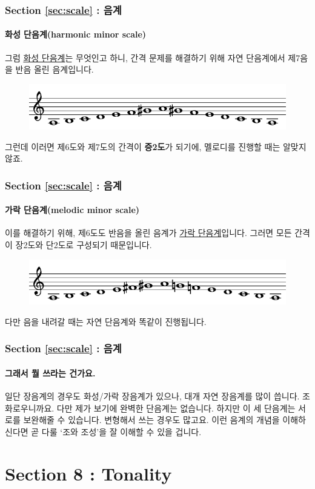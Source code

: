 \documentclass{beamer}
\begin{document}
	\begin{frame}
		\frametitle{Section \ref{sec:scale} : 음계}
		\framesubtitle{화성 단음계(harmonic minor scale)}
		그럼 {\color{cyan}\href{run:res/mp3/7/scale/harmonic_minor.mp3}{화성 단음계}}는 무엇인고 하니, 간격 문제를 해결하기 위해 자연 단음계에서 제7음을 반음 올린 음계입니다.
		\begin{figure}[!h]
			\centering
			{\includegraphics[width=\textwidth]{res/pdf/7/scale/harmonic_minor.pdf}}
		\end{figure}
		그런데 이러면 제6도와 제7도의 간격이 {\bf 증2도}가 되기에, 멜로디를 진행할 때는 알맞지 않죠. 
	\end{frame}
	
	\begin{frame}
		\frametitle{Section \ref{sec:scale} : 음계}
		\framesubtitle{가락 단음계(melodic minor scale)}
		이를 해결하기 위해, 제6도도 반음을 올린 음계가 {\color{cyan}\href{run:res/mp3/7/scale/melodic_minor.mp3}{가락 단음계}}입니다. 그러면 모든 간격이 장2도와 단2도로 구성되기 때문입니다.
		\begin{figure}[!h]
			\centering
			{\includegraphics[width=\textwidth]{res/pdf/7/scale/melodic_minor.pdf}}
		\end{figure}
		다만 음을 내려갈 때는 자연 단음계와 똑같이 진행됩니다.
	\end{frame}
	
	\begin{frame}
		\frametitle{Section \ref{sec:scale} : 음계}
		\framesubtitle{그래서 뭘 쓰라는 건가요.}
		일단 장음계의 경우도 화성/가락 장음계가 있으나, 대개 자연 장음계를 많이 씁니다. 조화로우니까요. 다만 제가 보기에 완벽한 단음계는 없습니다. 하지만 이 세 단음계는 서로를 보완해줄 수 있습니다. 변형해서 쓰는 경우도 많고요. 이런 음계의 개념을 이해하신다면 곧 다룰 `조와 조성'을 잘 이해할 수 있을 겁니다.  
	\end{frame}
	
	\section{Section 8 : Tonality}\label{sec:tonality}
\end{document}
